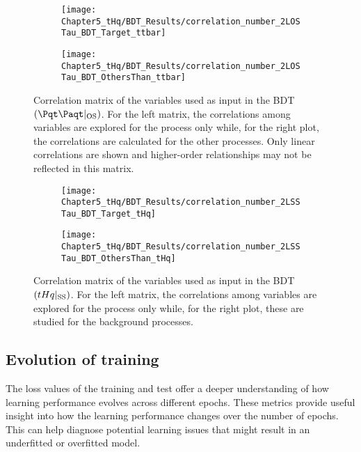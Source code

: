 \begin{figure}[h]
\centering
\begin{subfigure}{.475\textwidth}
  \centering
  \texttt{[image: Chapter5\_tHq/BDT\_Results/correlation\_number\_2LOSTau\_BDT\_Target\_ttbar]}
  \label{fig:ChaptH:EventSelection:BDT:Correlation:ttbarOS:target}
\end{subfigure}%
\begin{subfigure}{.475\textwidth}
  \centering
  \texttt{[image: Chapter5\_tHq/BDT\_Results/correlation\_number\_2LOSTau\_BDT\_OthersThan\_ttbar]}
  \label{fig:ChaptH:EventSelection:BDT:Correlation:ttbarOS:rest}
\end{subfigure}
\caption{Correlation matrix of the variables used as input in the BDT$(\ttbar|_{\text{OS}})$. 
For the left matrix, the correlations among variables are explored for the \ttbar process only while, for the right plot, the
correlations are calculated for the other processes. Only linear correlations are shown and higher-order relationships may not
be reflected in this matrix.}
\label{fig:ChaptH:EventSelection:BDT:Correlation:ttbarOS}
\end{figure}


\begin{figure}[h]
\centering
\begin{subfigure}{.475\textwidth}
  \centering
  \texttt{[image: Chapter5\_tHq/BDT\_Results/correlation\_number\_2LSSTau\_BDT\_Target\_tHq]}
  \label{fig:ChaptH:EventSelection:BDT:Correlation:tHqSS:target}
\end{subfigure}%
\begin{subfigure}{.475\textwidth}
  \centering
  \texttt{[image: Chapter5\_tHq/BDT\_Results/correlation\_number\_2LSSTau\_BDT\_OthersThan\_tHq]}
  \label{fig:ChaptH:EventSelection:BDT:Correlation:tHqSS:rest}
\end{subfigure}
\caption{Correlation matrix of the variables used as input in the BDT$(tHq|_{\text{SS}})$. 
For the left matrix, the correlations among variables are explored for the \tHq process only while, for the right plot, these
are studied for the background processes.}
\label{fig:ChaptH:EventSelection:BDT:Correlation:tHqSS}
\end{figure}


\subsection{Evolution of training}
\label{sec:BDT:AdditionalMaterial:Region:Evolution}
The loss values of the training and test offer a deeper understanding of how learning performance 
evolves across different epochs. These metrics provide useful insight into how the learning performance 
changes over the number of epochs. This can help diagnose potential learning issues that might 
result in an underfitted or overfitted model. %


